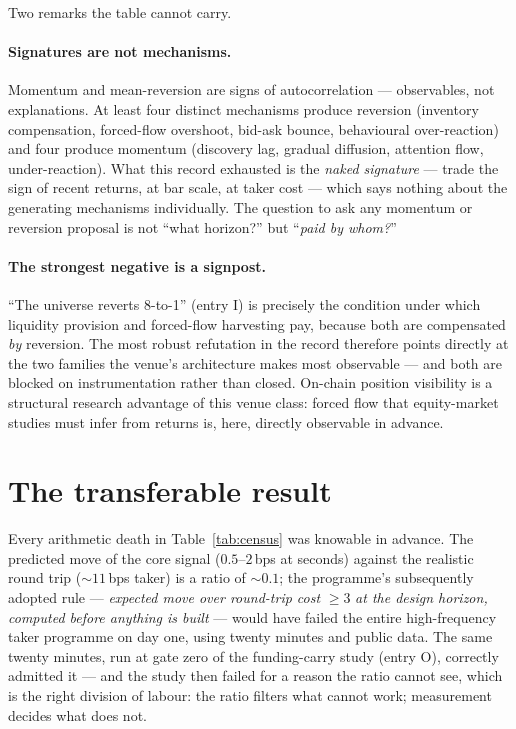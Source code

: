 \documentclass[11pt,a4paper]{article}
\begin{document}
Two remarks the table cannot carry.

\paragraph{Signatures are not mechanisms.} Momentum and mean-reversion
are signs of autocorrelation --- observables, not explanations. At
least four distinct mechanisms produce reversion (inventory
compensation, forced-flow overshoot, bid-ask bounce, behavioural
over-reaction) and four produce momentum (discovery lag, gradual
diffusion, attention flow, under-reaction). What this record exhausted
is the \emph{naked signature} --- trade the sign of recent returns, at
bar scale, at taker cost --- which says nothing about the generating
mechanisms individually. The question to ask any momentum or reversion
proposal is not ``what horizon?'' but ``\emph{paid by whom?}''

\paragraph{The strongest negative is a signpost.} ``The universe
reverts 8-to-1'' (entry I) is precisely the condition under which
liquidity provision and forced-flow harvesting pay, because both are
compensated \emph{by} reversion. The most robust refutation in the
record therefore points directly at the two families the venue's
architecture makes most observable --- and both are blocked on
instrumentation rather than closed. On-chain position visibility is a
structural research advantage of this venue class: forced flow that
equity-market studies must infer from returns is, here, directly
observable in advance.

\section{The transferable result}
\label{sec:lesson}

Every arithmetic death in Table~\ref{tab:census} was knowable in
advance. The predicted move of the core signal ($0.5$--$2$\,bps at
seconds) against the realistic round trip ($\sim$$11$\,bps taker) is a
ratio of ${\sim}0.1$; the programme's subsequently adopted rule ---
\emph{expected move over round-trip cost} $\ge 3$ \emph{at the design
horizon, computed before anything is built} --- would have failed the
entire high-frequency taker programme on day one, using twenty minutes
and public data. The same twenty minutes, run at gate zero of the
funding-carry study (entry O), correctly admitted it --- and the study
then failed for a reason the ratio cannot see, which is the right
division of labour: the ratio filters what cannot work; measurement
decides what does not.
\end{document}
